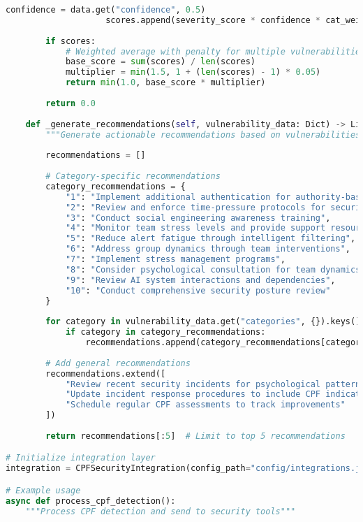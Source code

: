 \documentclass[11pt,a4paper]{article}
\begin{document}
\begin{lstlisting}[language=Python, caption=SIEM Integration Module]
                    confidence = data.get("confidence", 0.5)
                    scores.append(severity_score * confidence * cat_weight)
        
        if scores:
            # Weighted average with penalty for multiple vulnerabilities
            base_score = sum(scores) / len(scores)
            multiplier = min(1.5, 1 + (len(scores) - 1) * 0.05)
            return min(1.0, base_score * multiplier)
        
        return 0.0
    
    def _generate_recommendations(self, vulnerability_data: Dict) -> List[str]:
        """Generate actionable recommendations based on vulnerabilities"""
        
        recommendations = []
        
        # Category-specific recommendations
        category_recommendations = {
            "1": "Implement additional authentication for authority-based requests",
            "2": "Review and enforce time-pressure protocols for security decisions",
            "3": "Conduct social engineering awareness training",
            "4": "Monitor team stress levels and provide support resources",
            "5": "Reduce alert fatigue through intelligent filtering",
            "6": "Address group dynamics through team interventions",
            "7": "Implement stress management programs",
            "8": "Consider psychological consultation for team dynamics",
            "9": "Review AI system interactions and dependencies",
            "10": "Conduct comprehensive security posture review"
        }
        
        for category in vulnerability_data.get("categories", {}).keys():
            if category in category_recommendations:
                recommendations.append(category_recommendations[category])
        
        # Add general recommendations
        recommendations.extend([
            "Review recent security incidents for psychological patterns",
            "Update incident response procedures to include CPF indicators",
            "Schedule regular CPF assessments to track improvements"
        ])
        
        return recommendations[:5]  # Limit to top 5 recommendations

# Initialize integration layer
integration = CPFSecurityIntegration(config_path="config/integrations.json")

# Example usage
async def process_cpf_detection():
    """Process CPF detection and send to security tools"""
    

\end{lstlisting}
\end{document}
